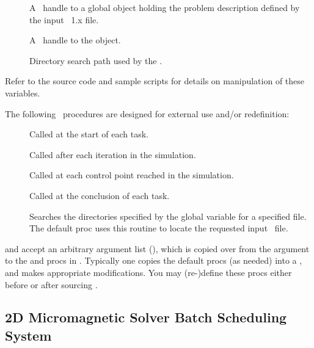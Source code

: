 \begin{description}
\item[] A \Tcl\ handle to a global 
  object holding the problem description defined by the input
  \MIF~1.x file.
\item[] A \Tcl\ handle to the  object.
\item[] Directory search path used by the
.

\end{description}
Refer to the source code and sample scripts for details on manipulation
of these variables.

\label{sec:batchsolveprocs}
The following \Tcl\ procedures are designed for external use and/or
redefinition:
\begin{description}
\item[]
   Called at the start of each task.
\item[]
   Called after each iteration in the simulation.
\item[]
   Called at each control point reached in the simulation.
\item[]
   Called at the conclusion of each task.
\item[]
   Searches the directories specified by the global variable
    for a specified file.  The default
    proc uses this routine to locate the requested
   input \MIF\ file.
\end{description}
 and  accept an arbitrary
argument list (), which is copied over from the 
argument to the  and  procs in
.  Typically one copies the default procs (as needed)
into a , and makes appropriate
modifications.  You may (re-)define these procs either before or after
sourcing .

\subsection{2D Micromagnetic Solver Batch Scheduling System}%
\label{sec:mmsolveBSS}


